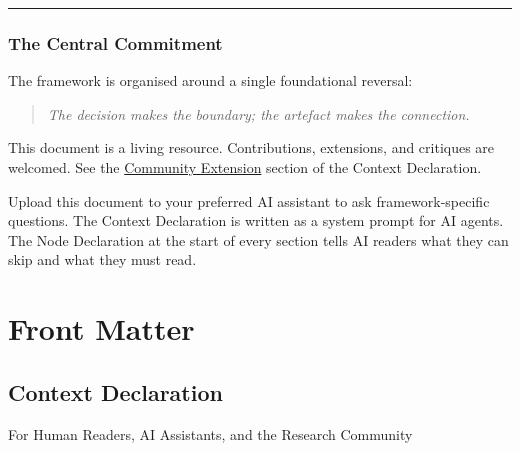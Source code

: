 \documentclass[
  11pt,
  a4paper,
  twoside,
  openright]{scrbook}
\begin{document}
\begin{center}\rule{0.5\linewidth}{0.5pt}\end{center}

\section*{The Central Commitment}\label{the-central-commitment}


The framework is organised around a single foundational reversal:

\begin{quote}
\emph{The decision makes the boundary; the artefact makes the
connection.}
\end{quote}

This document is a living resource. Contributions, extensions, and
critiques are welcomed. See the \hyperref[community-extension]{Community
Extension} section of the Context Declaration.

\begin{tcolorbox}[enhanced jigsaw, arc=.35mm, bottomrule=.15mm, bottomtitle=1mm, breakable, colback=white, colbacktitle=quarto-callout-note-color!10!white, colframe=quarto-callout-note-color-frame, coltitle=black, left=2mm, leftrule=.75mm, opacityback=0, opacitybacktitle=0.6, rightrule=.15mm, title=\textcolor{quarto-callout-note-color}{\faInfo}\hspace{0.5em}{AI-Assisted Engagement}, titlerule=0mm, toprule=.15mm, toptitle=1mm]

Upload this document to your preferred AI assistant to ask
framework-specific questions. The Context Declaration is written as a
system prompt for AI agents. The Node Declaration at the start of every
section tells AI readers what they can skip and what they must read.

\end{tcolorbox}

\part{Front Matter}

\chapter{Context Declaration}\label{context-declaration}

For Human Readers, AI Assistants, and the Research Community
\end{document}
